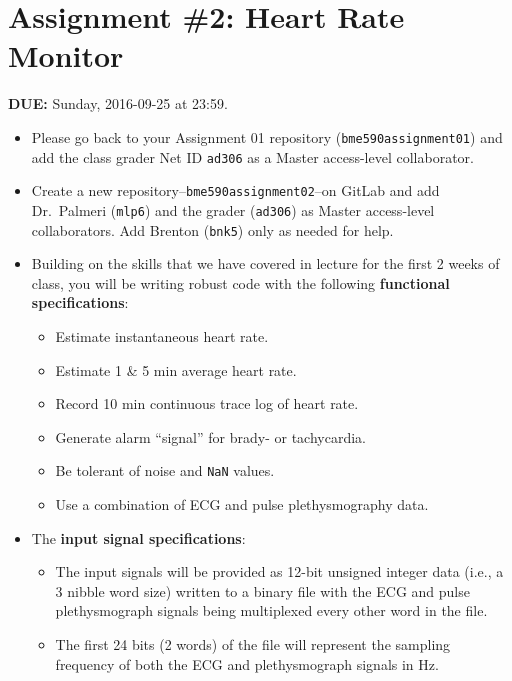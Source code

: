 


\section*{Assignment \#2: Heart Rate Monitor}

{\bf DUE:} Sunday, 2016-09-25 at 23:59.

\begin{itemize}

\item Please go back to your Assignment 01 repository (\verb+bme590assignment01+) and add the class grader Net ID \verb+ad306+ as a Master access-level collaborator.

\item Create a new repository--\verb+bme590assignment02+--on GitLab and add Dr.~Palmeri (\verb+mlp6+) and the grader (\verb+ad306+) as Master access-level collaborators.  Add Brenton (\verb+bnk5+) only as needed for help.

\item Building on the skills that we have covered in lecture for the first 2 weeks of class, you will be writing robust code with the following \textbf{functional specifications}:

\begin{itemize}
    \item Estimate instantaneous heart rate.
    \item Estimate 1 \& 5 min average heart rate.
    \item Record 10 min continuous trace log of heart rate.
    \item Generate alarm ``signal'' for brady- or tachycardia.
    \item Be tolerant of noise and \verb+NaN+ values.
    \item Use a combination of ECG and pulse plethysmography data.
\end{itemize}

\item The \textbf{input signal specifications}:
\begin{itemize}
    \item The input signals will be provided as 12-bit unsigned integer data (i.e., a 3 nibble word size) written to a binary file with the ECG and pulse plethysmograph signals being multiplexed every other word in the file.
    \item The first 24 bits (2 words) of the file will represent the sampling frequency of both the ECG and plethysmograph signals in Hz.
\end{itemize}


\end{itemize}
